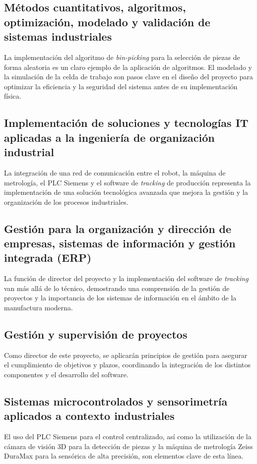 \documentclass[12pt, a4paper]{article}
\begin{document}
\subsection{Métodos cuantitativos, algoritmos, optimización, modelado y validación de sistemas industriales}
La implementación del algoritmo de \textit{bin-picking} para la selección de piezas de forma aleatoria es un claro ejemplo de la aplicación de algoritmos. El modelado y la simulación de la celda de trabajo son pasos clave en el diseño del proyecto para optimizar la eficiencia y la seguridad del sistema antes de su implementación física.

\subsection{Implementación de soluciones y tecnologías IT aplicadas a la ingeniería de organización industrial}
La integración de una red de comunicación entre el robot, la máquina de metrología, el PLC Siemens y el software de \textit{tracking} de producción representa la implementación de una solución tecnológica avanzada que mejora la gestión y la organización de los procesos industriales.

\subsection{Gestión para la organización y dirección de empresas, sistemas de información y gestión integrada (ERP)}
La función de director del proyecto y la implementación del software de \textit{tracking} van más allá de lo técnico, demostrando una comprensión de la gestión de proyectos y la importancia de los sistemas de información en el ámbito de la manufactura moderna.

\subsection{Gestión y supervisión de proyectos}
Como director de este proyecto, se aplicarán principios de gestión para asegurar el cumplimiento de objetivos y plazos, coordinando la integración de los distintos componentes y el desarrollo del software.

\subsection{Sistemas microcontrolados y sensorimetría aplicados a contexto industriales}
El uso del PLC Siemens para el control centralizado, así como la utilización de la cámara de visión 3D para la detección de piezas y la máquina de metrología Zeiss DuraMax para la sensórica de alta precisión, son elementos clave de esta línea.
\end{document}
